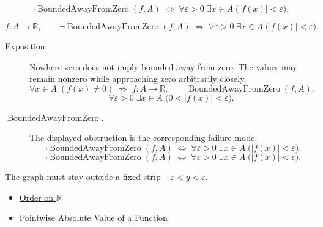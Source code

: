 \begin{remark*}
\[
  \neg\operatorname{BoundedAwayFromZero}(f,A)
  \;\Longleftrightarrow\;
  \forall\varepsilon>0\;\exists x\in A\;\bigl(|f(x)|<\varepsilon\bigr).
\]
\end{remark*}

\begin{remark*}
\[
  f\colon A\to\mathbb{R},\qquad
  \neg\operatorname{BoundedAwayFromZero}(f,A)
  \;\Longleftrightarrow\;
  \forall\varepsilon>0\;\exists x\in A\;\bigl(|f(x)|<\varepsilon\bigr).
\]
\end{remark*}



\begin{remark*}
\begin{description}
  \item[Exposition.]
Nowhere zero does not imply bounded away from zero.  The values may remain
nonzero while approaching zero arbitrarily closely.
\[
  \forall x\in A\;(f(x)\neq0)
  \;\not\Longrightarrow\;
  f\colon A\to\mathbb{R},\qquad\operatorname{BoundedAwayFromZero}(f,A).
\]
\[
  \forall\varepsilon>0\;\exists x\in A\;\bigl(0<|f(x)|<\varepsilon\bigr).
\]


  \item[\(\operatorname{BoundedAwayFromZero}.\)]
  The displayed obstruction is the corresponding failure mode.
  \[
  \neg\operatorname{BoundedAwayFromZero}(f,A)
  \;\Longleftrightarrow\;
  \forall\varepsilon>0\;\exists x\in A\;\bigl(|f(x)|<\varepsilon\bigr).
\]
  \[
  \neg\operatorname{BoundedAwayFromZero}(f,A)
  \;\Longleftrightarrow\;
  \forall\varepsilon>0\;\exists x\in A\;\bigl(|f(x)|<\varepsilon\bigr).
\]
\end{description}
\end{remark*}

\begin{remark*}[Interpretation]
The graph must stay outside a fixed strip \(-\varepsilon<y<\varepsilon\).
\end{remark*}

\begin{dependencies}
\begin{itemize}
  \item \hyperref[def:order-on-r]{Order on \(\mathbb{R}\)}
  \item \hyperref[def:pointwise-absolute-value-of-a-function]{Pointwise Absolute Value of a Function}
\end{itemize}
\end{dependencies}

